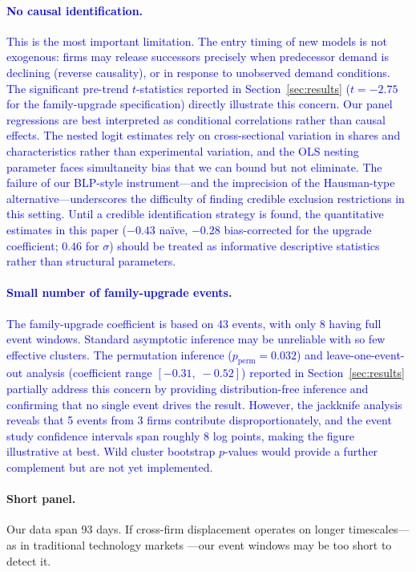 \documentclass[11pt, a4paper]{article}
\begin{document}
\textcolor{blue}{\paragraph{No causal identification.} This is the most important limitation. The entry timing of new models is not exogenous: firms may release successors precisely when predecessor demand is declining (reverse causality), or in response to unobserved demand conditions. The significant pre-trend $t$-statistics reported in Section~\ref{sec:results} ($t = -2.75$ for the family-upgrade specification) directly illustrate this concern. Our panel regressions are best interpreted as conditional correlations rather than causal effects. The nested logit estimates rely on cross-sectional variation in shares and characteristics rather than experimental variation, and the OLS nesting parameter faces simultaneity bias that we can bound but not eliminate. The failure of our BLP-style instrument---and the imprecision of the Hausman-type alternative---underscores the difficulty of finding credible exclusion restrictions in this setting. Until a credible identification strategy is found, the quantitative estimates in this paper ($-0.43$ na\"ive, $-0.28$ bias-corrected for the upgrade coefficient; $0.46$ for $\sigma$) should be treated as informative descriptive statistics rather than structural parameters.}

\textcolor{blue}{\paragraph{Small number of family-upgrade events.} The family-upgrade coefficient is based on 43 events, with only 8 having full event windows. Standard asymptotic inference may be unreliable with so few effective clusters. The permutation inference ($p_{\text{perm}} = 0.032$) and leave-one-event-out analysis (coefficient range $[-0.31,\; -0.52]$) reported in Section~\ref{sec:results} partially address this concern by providing distribution-free inference and confirming that no single event drives the result. However, the jackknife analysis reveals that 5 events from 3 firms contribute disproportionately, and the event study confidence intervals span roughly 8 log points, making the figure illustrative at best. Wild cluster bootstrap $p$-values would provide a further complement but are not yet implemented.}

\paragraph{Short panel.} Our data span 93 days. If cross-firm displacement operates on longer timescales---as in traditional technology markets \citep{bresnahan1999technological}---our event windows may be too short to detect it.
\end{document}
